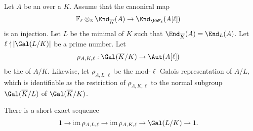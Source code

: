 \begin{proposition} \label{proposition:short_exact_sequence_of_galois_groups_for_extension_of_base_field_of_abelian_variety_that_gains_all_geometric_endomorphisms_yields_short_exact_sequence_of_mod_ell_torsion_if_ell_does_not_divide_order_of_galois_group}

    Let $A$ be an  over a  $K$. 
    Assume that the canonical map
    \begin{equation} \label{eq:injection_of_mod_ell_canonical_map_from_endomorphisms_of_abelian_variety_to_mod_ell_torsion_endomorphisms}
    \mathbb{F}_\ell \otimes_{\mathbb{Z}} \End_{\overline{K}}(A) \to \End_{\bbF_\ell}(A[\ell])
    \end{equation}
    is an injection.
    Let $L$ be the minimal  of $K$ such that $\End_{\overline{K}}(A) = \End_{L}(A)$.  Let $\ell \nmid |\Gal(L/K)|$ be a prime number. Let 
    $$\rho_{A,K,\ell}: \Gal(\overline{K}/K) \to \Aut(A[\ell])$$ 
    be the  of $A/K$. Likewise, let $\rho_{A,L,\ell}$ be the mod-$\ell$ Galois representation of $A/L$, which is identifiable as the restriction of $\rho_{A,K,\ell}$ to the normal subgroup $\Gal(\overline{K}/L)$ of $\Gal(\overline{K}/K)$. 

    There is a short exact sequence
    $$1 \to \operatorname{im} \rho_{A,L,\ell} \to \operatorname{im} \rho_{A,K,\ell} \to \Gal(L/K) \to 1.$$
\end{proposition}
